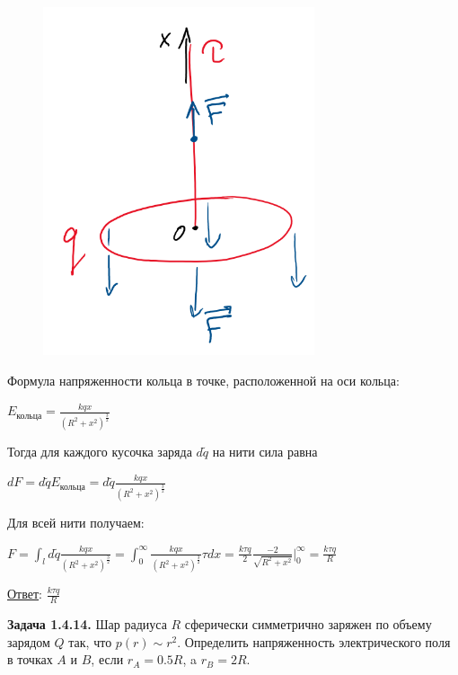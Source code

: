 \documentclass[12pt]{article}
\begin{document}
\begin{minipage}{\textwidth}
    \begin{figure}
        \includegraphics[width=8cm]{physics1/images/physics1_homework_6_3}
    \end{figure}

    Формула напряженности кольца в точке, расположенной на оси кольца: 

    $E_{\text{кольца}} = \frac{kqx}{(R^2 + x^2)^{\frac{3}{2}}}$

    Тогда для каждого кусочка заряда $d\tilde{q}$ на нити сила равна

    $dF = d\tilde{q} E_{\text{кольца}} = d\tilde{q} \frac{kqx}{(R^2 + x^2)^{\frac{3}{2}}}$

    Для всей нити получаем: 

    $F = \int_l d\tilde{q} \frac{kqx}{(R^2 + x^2)^{\frac{3}{2}}} = \int_0^\infty \frac{kqx}{(R^2 + x^2)^{\frac{3}{2}}} \tau dx = 
    \frac{k\tau q}{2} \frac{-2}{\sqrt{R^2 + x^2}} \Big|_0^\infty = \frac{k\tau q}{R}$
\end{minipage}

\underline{Ответ}: $\frac{k\tau q}{R}$

\clearpage

\begin{tcolorbox}
    \textbf{Задача 1.4.14.} Шар радиуса $R$ сферически симметрично
    заряжен по объему зарядом $Q$ так, что $p(r) \sim r^2$. Определить
    напряженность электрического поля в точках $A$ и $B$, если $r_A = 0.5R$,
    a $r_B=2R$.
\end{tcolorbox}
\end{document}

